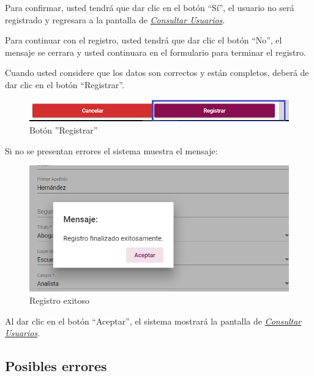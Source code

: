            Para confirmar, usted tendrá que dar clic en el botón “Sí”, el usuario no será registrado y regresara a la pantalla de \hyperlink{consultarUs}{\textit{Consultar Usuarios}}.
            
            Para continuar con el registro, usted tendrá que  dar clic el botón “No”, el mensaje se cerrara y usted continuara en el formulario para terminar el registro.
            
            Cuando usted considere que los datos son correctos y están completos, deberá de dar clic en el botón “Registrar”.
            
            \begin{figure}[!hbtp]
                \centering
                \hypertarget{btnreg}{\includegraphics[width=0.7\linewidth]{images/SP5/BtnRegistrar}}
                \caption{Botón ''Registrar''}
                \label{btnreg}
            \end{figure}
            
            Si no se presentan errores el sistema muestra el mensaje:
            
            	 
             \begin{figure}[!hbtp]
            	\centering
            \includegraphics[width=0.4\linewidth]{images/SP5/MSG5}
            	\caption{Registro exitoso}
            	\label{mensaje5}
            	
            \end{figure}
        
            Al dar clic en el botón “Aceptar”, el sistema mostrará la pantalla de  \hyperlink{consultarUs}{\textit{Consultar Usuarios}}.
    
            \subsection{Posibles errores} 
        
